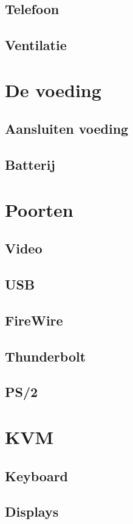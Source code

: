 \documentclass[a4paper,12pt,twoside,openright,titlepage]{book}
\begin{document}
\section{Telefoon}
\section{Ventilatie}

\chapter{De voeding}
\section{Aansluiten voeding}
\section{Batterij}

\chapter{Poorten}
\section{Video}
\section{USB}
\section{FireWire}
\section{Thunderbolt}
\section{PS/2}

\chapter{KVM}
\section{Keyboard}
\section{Displays}
\end{document}
